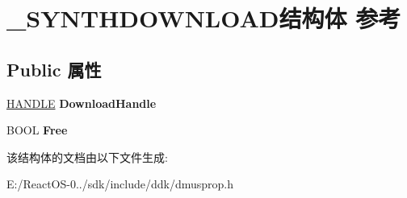 \hypertarget{struct___s_y_n_t_h_d_o_w_n_l_o_a_d}{}\section{\+\_\+\+S\+Y\+N\+T\+H\+D\+O\+W\+N\+L\+O\+A\+D结构体 参考}
\label{struct___s_y_n_t_h_d_o_w_n_l_o_a_d}
\subsection*{Public 属性}
\begin{DoxyCompactItemize}
\item 
\mbox{\label{struct___s_y_n_t_h_d_o_w_n_l_o_a_d_a51f3d07ed312dceb88bc87638dc53cf6}} 
\hyperlink{interfacevoid}{H\+A\+N\+D\+LE} {\bfseries Download\+Handle}
\item 
\mbox{\label{struct___s_y_n_t_h_d_o_w_n_l_o_a_d_a204df97bd5fdf851262ff47722e47131}} 
B\+O\+OL {\bfseries Free}
\end{DoxyCompactItemize}


该结构体的文档由以下文件生成\+:\begin{DoxyCompactItemize}
\item 
E\+:/\+React\+O\+S-\/0../sdk/include/ddk/dmusprop.\+h\end{DoxyCompactItemize}
